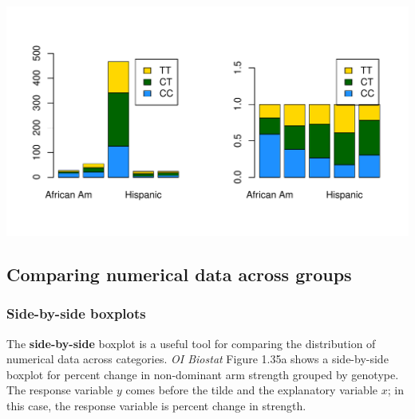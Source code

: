 \documentclass{report}\usepackage[]{graphicx}\usepackage[]{color}
\makeatletter
\def\maxwidth{ %
  \ifdim\Gin@nat@width>\linewidth
    \linewidth
  \else
    \Gin@nat@width
  \fi
}
\newenvironment{knitrout}{}{} %
\makeatother
\begin{document}
\begin{knitrout}
{\centering \includegraphics[width=\maxwidth]{figure/unnamed-chunk-38-1} 

}



\end{knitrout}

\subsection{Comparing numerical data across groups}
\subsubsection{Side-by-side boxplots}

The \textbf{side-by-side} boxplot is a useful tool for comparing the distribution of numerical data across categories. \textit{OI Biostat} Figure 1.35a shows a side-by-side boxplot for percent change in non-dominant arm strength grouped by genotype. The response variable $y$ comes before the tilde and the explanatory variable $x$; in this case, the response variable is percent change in strength.
\end{document}
